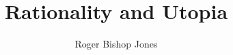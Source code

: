 \documentclass[10pt,a4paper,titlepage,openany,twocolumn]{book}
\begin{document}
\author{Roger Bishop Jones}
\title{Rationality and Utopia}
\maketitle
\tableofcontents
\end{document}
